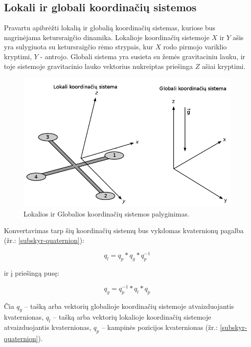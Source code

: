 \documentclass[12pt, a4paper, lithuanian, final]{article}
\begin{document}
\subsection{Lokali ir globali koordinačių sistemos}
Pravartu apibrėžti lokalią ir globalią koordinačių sistemas, kuriose bus nagrinėjama ketursraigčio dinamika.
Lokalioje koordinačių sistemoje $X$ ir $Y$ ašis yra sulygiuota su ketursraigčio rėmo strypais, kur $X$ rodo pirmojo variklio kryptimi, $Y$ - antrojo.
Globali sistema yra susieta su žemės gravitaciniu lauku, ir toje sistemoje gravitacinio lauko vektorius nukreiptas priešinga $Z$ ašiai kryptimi.

\begin{figure}[H]
\begin{center}
\includegraphics[width=1.0\textwidth]{img/Quadcopter_Coordinates.png}
\caption{Lokalios ir Globalios koordinačių sistemos palyginimas.}
\end{center}
\end{figure}


Konvertavimas tarp šių koordinačių sistemų bus vykdomas kvaternionų pagalba (žr.: \ref{subskyr-quaternion}):

\begin{equation}
	q_{l} = q_{p} * q_{g} * q_{p}^{-1}
\end{equation}

ir į priešingą pusę:

\begin{equation}
	q_{g} = q_{p}^{-1} * q_{l} * q_{p}
\end{equation}

Čia $q_{g}$ -- tašką arba vektorių globalioje koordinačių sistemoje atvaizduojantis kvaternionas, $q_{l}$ -- tašką arba vektorių lokalioje koordinačių sistemoje atvaizduojantis kvaternionas, $q_{p}$ -- kampinės pozicijos kvaternionas (žr.: \ref{subskyr-quaternion}).
\end{document}
